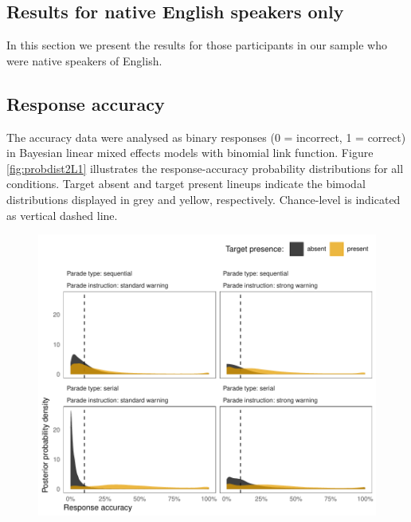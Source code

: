 \clearpage
\makeatletter
\efloat@restorefloats
\makeatother


\begin{appendix}
\hypertarget{results-for-native-english-speakers-only}{%
\section{Results for native English speakers
only}\label{results-for-native-english-speakers-only}}

In this section we present the results for those participants in our
sample who were native speakers of English.

\hypertarget{response-accuracy}{%
\subsection{Response accuracy}\label{response-accuracy}}

The accuracy data were analysed as binary responses (0 = incorrect, 1 =
correct) in Bayesian linear mixed effects models with binomial link
function. Figure \ref{fig:probdist2L1} illustrates the response-accuracy
probability distributions for all conditions. Target absent and target
present lineups indicate the bimodal distributions displayed in grey and
yellow, respectively. Chance-level is indicated as vertical dashed line.

\begin{figure}[!ht]

{\centering \includegraphics{../plots/online_probdist_byFA_L1} 

}
\end{figure}
\end{appendix}
